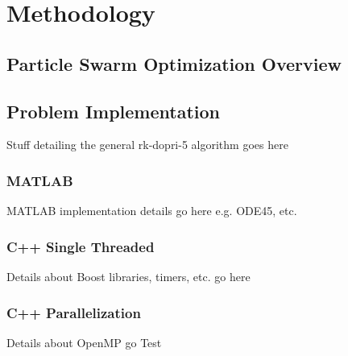 \chapter{Methodology}
\section{Particle Swarm Optimization Overview}
\section{Problem Implementation}
Stuff detailing the general rk-dopri-5 algorithm goes here
\subsection{MATLAB}
MATLAB implementation details go here e.g. ODE45, etc.
\subsection{C++ Single Threaded}
Details about Boost libraries, timers, etc. go here
\subsection{C++ Parallelization}
Details about OpenMP go Test

\newpage